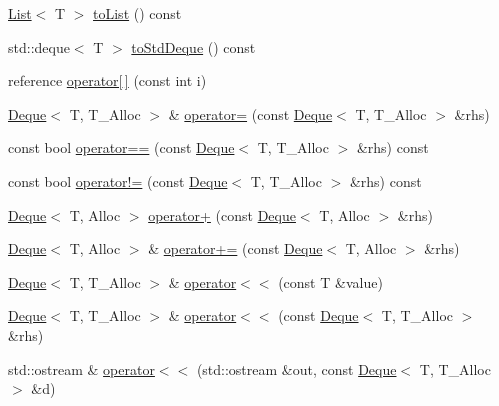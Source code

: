 \begin{DoxyCompactItemize}
\item 
\hyperlink{classprism_1_1_list}{List}$<$ T $>$ \hyperlink{namespaceprism_a07654e91e7474a3ccdcd95bb5e57baea}{to\+List} () const 
\item 
std\+::deque$<$ T $>$ \hyperlink{namespaceprism_a770640a1fe99095d96e9295b225ac93d}{to\+Std\+Deque} () const 
\item 
reference \hyperlink{namespaceprism_ae5cdc796ecf7df67ce6377bfe9eadb7c}{operator\mbox{[}$\,$\mbox{]}} (const int i)
\item 
\hyperlink{namespaceprism_a8e77ed12f9b3a35d81935362d3050d0c}{Deque}$<$ T, T\+\_\+\+Alloc $>$ \& \hyperlink{namespaceprism_ab5a3ba3d60ef11974d02f7941fa9a263}{operator=} (const \hyperlink{namespaceprism_a8e77ed12f9b3a35d81935362d3050d0c}{Deque}$<$ T, T\+\_\+\+Alloc $>$ \&rhs)
\item 
const bool \hyperlink{namespaceprism_a54ae8f7d8d796d783af55f13ae4de95b}{operator==} (const \hyperlink{namespaceprism_a8e77ed12f9b3a35d81935362d3050d0c}{Deque}$<$ T, T\+\_\+\+Alloc $>$ \&rhs) const 
\item 
const bool \hyperlink{namespaceprism_a5842267ec092ff201f89eefcc9540b44}{operator!=} (const \hyperlink{namespaceprism_a8e77ed12f9b3a35d81935362d3050d0c}{Deque}$<$ T, T\+\_\+\+Alloc $>$ \&rhs) const 
\item 
\hyperlink{namespaceprism_a8e77ed12f9b3a35d81935362d3050d0c}{Deque}$<$ T, Alloc $>$ \hyperlink{namespaceprism_a769b9ece349795edbfeb8e33cbf276e5}{operator+} (const \hyperlink{namespaceprism_a8e77ed12f9b3a35d81935362d3050d0c}{Deque}$<$ T, Alloc $>$ \&rhs)
\item 
\hyperlink{namespaceprism_a8e77ed12f9b3a35d81935362d3050d0c}{Deque}$<$ T, Alloc $>$ \& \hyperlink{namespaceprism_a1619579754dfe66f3fe3559f2e4495e5}{operator+=} (const \hyperlink{namespaceprism_a8e77ed12f9b3a35d81935362d3050d0c}{Deque}$<$ T, Alloc $>$ \&rhs)
\item 
\hyperlink{namespaceprism_a8e77ed12f9b3a35d81935362d3050d0c}{Deque}$<$ T, T\+\_\+\+Alloc $>$ \& \hyperlink{namespaceprism_a40203d2e776fe0acf317a98ef08f8be7}{operator$<$$<$} (const T \&value)
\item 
\hyperlink{namespaceprism_a8e77ed12f9b3a35d81935362d3050d0c}{Deque}$<$ T, T\+\_\+\+Alloc $>$ \& \hyperlink{namespaceprism_a602c194731bf182cf114b7d297bbff51}{operator$<$$<$} (const \hyperlink{namespaceprism_a8e77ed12f9b3a35d81935362d3050d0c}{Deque}$<$ T, T\+\_\+\+Alloc $>$ \&rhs)
\item 
std\+::ostream \& \hyperlink{namespaceprism_a554e40f4cee7980e001683ea75b16cd9}{operator$<$$<$} (std\+::ostream \&out, const \hyperlink{namespaceprism_a8e77ed12f9b3a35d81935362d3050d0c}{Deque}$<$ T, T\+\_\+\+Alloc $>$ \&d)

\end{DoxyCompactItemize}
